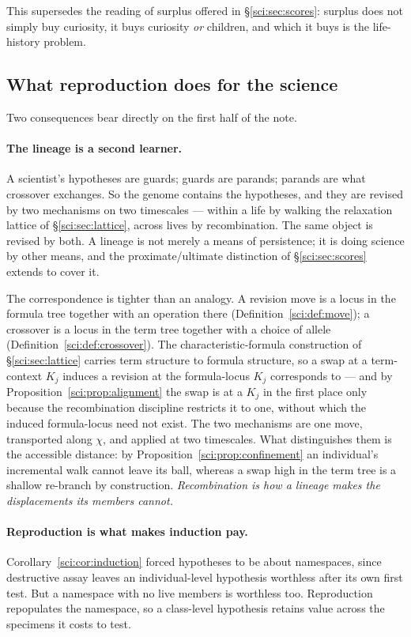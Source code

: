 This supersedes the reading of surplus offered in \S\ref{sci:sec:scores}: surplus does not simply buy
curiosity, it buys curiosity \emph{or} children, and which it buys is the life-history problem.

\subsection{What reproduction does for the science}\label{sci:S12.10}

Two consequences bear directly on the first half of the note.

\paragraph{The lineage is a second learner.} A scientist's hypotheses are guards; guards are parands;
parands are what crossover exchanges. So the genome contains the hypotheses, and they are revised by
two mechanisms on two timescales --- within a life by walking the relaxation lattice of
\S\ref{sci:sec:lattice}, across lives by recombination. The same object is revised by both. A lineage is
not merely a means of persistence; it is doing science by other means, and the proximate/ultimate
distinction of \S\ref{sci:sec:scores} extends to cover it.

\label{sci:sec:transport}%
The correspondence is tighter than an analogy. A revision move is a locus in the formula tree together
with an operation there (Definition~\ref{sci:def:move}); a crossover is a locus in the term tree together
with a choice of allele (Definition~\ref{sci:def:crossover}). The characteristic-formula construction of
\S\ref{sci:sec:lattice} carries term structure to formula structure, so a swap at a term-context $K_j$
induces a revision at the formula-locus $K_j$ corresponds to --- and by
Proposition~\ref{sci:prop:alignment} the swap is at a $K_j$ in the first place only because the
recombination discipline restricts it to one, without which the induced formula-locus need not
exist. The two mechanisms are one move,
transported along $\chi$, and applied at two timescales. What distinguishes them is the accessible
distance: by Proposition~\ref{sci:prop:confinement} an individual's incremental walk cannot leave its ball,
whereas a swap high in the term tree is a shallow re-branch by construction. \emph{Recombination is how
a lineage makes the displacements its members cannot.}

\paragraph{Reproduction is what makes induction pay.} Corollary~\ref{sci:cor:induction} forced hypotheses
to be about namespaces, since destructive assay leaves an individual-level hypothesis worthless after
its own first test. But a namespace with no live members is worthless too. Reproduction repopulates
the namespace, so a class-level hypothesis retains value across the specimens it costs to test.


